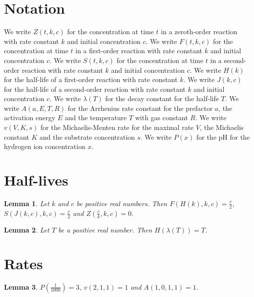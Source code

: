 \documentclass{article}
\newtheorem{lemma}{Lemma}
\begin{document}
\section{Notation}

We write $Z(t,k,c)$ for the concentration at time $t$ in a zeroth-order reaction with rate constant $k$ and initial concentration $c$.
We write $F(t,k,c)$ for the concentration at time $t$ in a first-order reaction with rate constant $k$ and initial concentration $c$.
We write $S(t,k,c)$ for the concentration at time $t$ in a second-order reaction with rate constant $k$ and initial concentration $c$.
We write $H(k)$ for the half-life of a first-order reaction with rate constant $k$.
We write $J(k,c)$ for the half-life of a second-order reaction with rate constant $k$ and initial concentration $c$.
We write $\lambda(T)$ for the decay constant for the half-life $T$.
We write $A(a,E,T,R)$ for the Arrhenius rate constant for the prefactor $a$, the activation energy $E$ and the temperature $T$ with gas constant $R$.
We write $v(V,K,s)$ for the Michaelis-Menten rate for the maximal rate $V$, the Michaelis constant $K$ and the substrate concentration $s$.
We write $P(x)$ for the pH for the hydrogen ion concentration $x$.

\section{Half-lives}

\begin{lemma}\label{half}
Let $k$ and $c$ be positive real numbers. Then $F(H(k),k,c)=\frac{c}{2}$, $S(J(k,c),k,c)=\frac{c}{2}$ and $Z(\frac{c}{k},k,c)=0$.
\end{lemma}

\begin{lemma}\label{decay}
Let $T$ be a positive real number. Then $H(\lambda(T))=T$.
\end{lemma}

\section{Rates}

\begin{lemma}\label{rates}
$P(\frac{1}{1000})=3$, $v(2,1,1)=1$ and $A(1,0,1,1)=1$.
\end{lemma}
\end{document}
